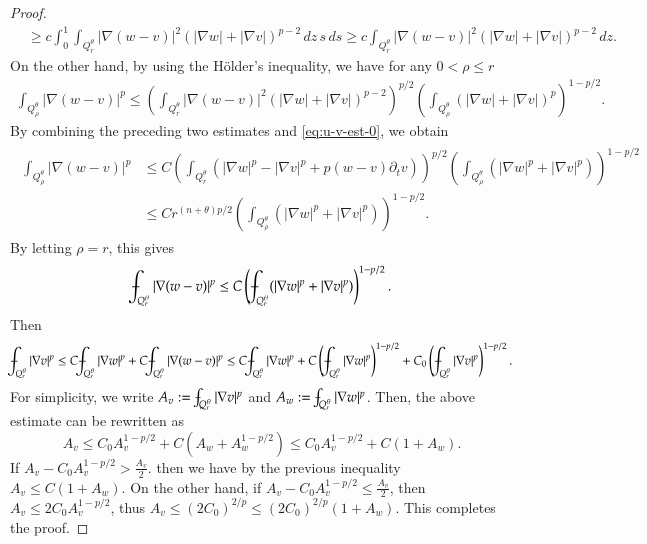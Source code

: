 \documentclass[11pt,oneside,english]{amsart}
\newcommand{\D}{\nabla}
\numberwithin{equation}{section}
\def\Xint#1{\mathchoice
  {\XXint\displaystyle\textstyle{#1}}%
  {\XXint\textstyle\scriptstyle{#1}}%
  {\XXint\scriptstyle\scriptscriptstyle{#1}}%
  {\XXint\scriptscriptstyle\scriptscriptstyle{#1}}%
  \!\int}
\def\XXint#1#2#3{{\setbox0=\hbox{$#1{#2#3}{\int}$}
    \vcenter{\hbox{$#2#3$}}\kern-.5\wd0}}
\def\dashint{\Xint-}
\theoremstyle{plain}
\numberwithin{equation}{section}
\begin{document}
\begin{proof}
\begin{align*}
    &\ge c\int_0^1\int_{Q_r^\theta}|\D(w-v)|^2(|\D w|+|\D v|)^{p-2}\,dz\,s\,ds\ge c\int_{Q_r^\theta}|\D(w-v)|^2(|\D w|+|\D v|)^{p-2}\,dz.
\end{align*}
On the other hand, by using the Hölder's inequality, we have for any $0<\rho\le r$
\begin{align*}
    \int_{Q_\rho^\theta}|\D(w-v)|^p\le \left(\int_{Q_r^\theta}|\D(w-v)|^2(|\D w|+|\D v|)^{p-2}\right)^{p/2}\left(\int_{Q_\rho^\theta}(|\D w|+|\D v|)^p\right)^{1-p/2}.
\end{align*}
By combining the preceding two estimates and \eqref{eq:u-v-est-0}, we obtain
\begin{align}
    \label{eq:par-u-v-diff-est}
    \begin{split}
        \int_{Q_\rho^\theta}|\D(w-v)|^p&\le C\left(\int_{Q_r^\theta}(|\D w|^p-|\D v|^p+p(w-v)\partial_tv)\right)^{p/2}\left(\int_{Q_\rho^\theta}(|\D w|^p+|\D v|^p)\right)^{1-p/2}\\
        &\le Cr^{(n+\theta)p/2}\left(\int_{Q_\rho^\theta}(|\D w|^p+|\D v|^p)\right)^{1-p/2}.
    \end{split}
\end{align}
By letting $\rho=r$, this gives
\begin{align*}
    \dashint_{Q_{r}^\theta}|\D(w-v)|^p\le C\left(\dashint_{Q_{r}^\theta}(|\D w|^p+|\D v|^p)\right)^{1-p/2}.
\end{align*}
Then
\begin{align*}
    \dashint_{Q_r^\theta}|\D v|^p\le C\dashint_{Q_r^\theta}|\D w|^p+C\dashint_{Q_r^\theta}|\D(w-v)|^p\le C\dashint_{Q_r^\theta}|\D w|^p+C\left(\dashint_{Q_r^\theta}|\D w|^p\right)^{1-p/2}+C_0\left(\dashint_{Q_r^\theta}|\D v|^p\right)^{1-p/2}.
\end{align*}
For simplicity, we write $A_v:=\dashint_{Q_r^\theta}|\D v|^p$ and $A_w:=\dashint_{Q_r^\theta}|\D w|^p$. Then, the above estimate can be rewritten as
$$
A_v\le C_0A_v^{1-p/2}+C\left(A_w+A_w^{1-p/2}\right)\le C_0A_v^{1-p/2}+C(1+A_w).
$$
If $A_v-C_0A_v^{1-p/2}>\frac{A_v}2$. then we have by the previous inequality $A_v\le C(1+A_w)$. On the other hand, if $A_v-C_0A_v^{1-p/2}\le \frac{A_v}{2}$, then $A_v\le 2C_0A_v^{1-p/2}$, thus $A_v\le (2C_0)^{2/p}\le (2C_0)^{2/p}(1+A_w)$. This completes the proof.    
\end{proof}
\end{document}
